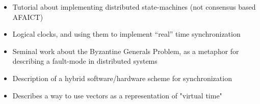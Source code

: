 \documentclass[a4paper,12pt]{article}
\begin{document}
\begin{itemize}
\item \cite{Schneider90} Tutorial about implementing distributed state-machines (not consensus based AFAICT)
\item \cite{Lamport78} Logical clocks, and using them to implement ``real'' time synchronization
\item \cite{Lamport82} Seminal work about the Byzantine Generals Problem, as a metaphor for describing a fault-mode in distributed systems
\item \cite{Ramanathan90} Description of a hybrid software/hardware scheme for synchronization
\item \cite{Mattern88virtualtime} Describes a way to use vectors as a representation of "virtual time"
\end{itemize}

\printbibliography
\end{document}
